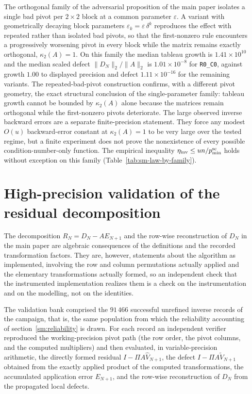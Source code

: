 \documentclass[supplement,review,onefignum,onetabnum]{siamart251216}
\begin{document}
The orthogonal family of the adversarial proposition of the main paper isolates a single bad
pivot per $2\times2$ block at a common parameter $\varepsilon$. A variant with
geometrically decaying block parameters $\varepsilon_k=\varepsilon\,\delta^{k}$
reproduces the effect with repeated rather than isolated bad pivots, so that
the first-nonzero rule encounters a progressively worsening pivot in every
block while the matrix remains exactly orthogonal, $\kappa_2(A)=1$. On this
family the median tableau growth is $1.41\times10^{10}$ and the median scaled
defect $\|D_N\|_2/\|A\|_2$ is $1.01\times10^{-8}$ for \texttt{R0\_C0}, against
growth $1.00$ to displayed precision and defect $1.11\times10^{-16}$ for the remaining variants.
The repeated-bad-pivot construction confirms, with a different pivot geometry, the exact structural
conclusion of the single-parameter family: tableau growth cannot be bounded by $\kappa_2(A)$
alone because the matrices remain orthogonal while the first-nonzero pivots deteriorate. The large
observed inverse backward errors are a separate finite-precision statement. They force any modest
$O(u)$ backward-error constant at $\kappa_2(A)=1$ to be very large over the tested regime, but a
finite experiment does not prove the nonexistence of every possible condition-number-only
function. The empirical inequality
$\eta_{\mathrm{inv}}\le un/p^{\rm sc}_{\min}$ holds without exception on this family
(Table~\ref{tab:sm-law-by-family}).

\section{High-precision validation of the residual decomposition}
\label{sm:validation}

The decomposition $R_N=D_N-AE_{N+1}$ and the row-wise reconstruction of $D_N$ in the
main paper are algebraic consequences of the definitions and the recorded transformation factors. They are, however, statements about the algorithm as implemented,
involving the row and column permutations actually applied and the elementary
transformations actually formed, so an independent check that the instrumented
implementation realizes them is a check on the instrumentation and on the
modelling, not on the identities.

The validation bank comprised the $91\,466$ successful unrefined inverse records
of the campaign, that is, the same population from which the reliability
accounting of section~\ref{sm:reliability} is drawn. For each record an
independent verifier reproduced the working-precision pivot path (the row
order, the pivot columns, and the computed multipliers) and then evaluated,
in variable-precision arithmetic, the directly formed residual
$I-\Pi A\widehat V_{N+1}$, the defect $I-\Pi A\widetilde V_{N+1}$ obtained from
the exactly applied product of the computed transformations, the accumulated
application error $E_{N+1}$, and the row-wise reconstruction of $D_N$ from the
propagated local defects.
\end{document}
